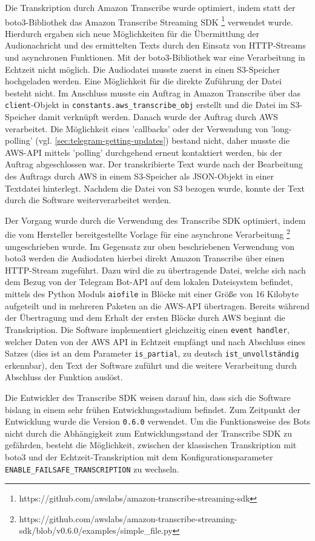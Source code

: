 Die Transkription durch Amazon Transcribe wurde optimiert, indem statt der boto3-Bibliothek das Amazon Transcribe Streaming SDK \footnote{https://github.com/awslabs/amazon-transcribe-streaming-sdk} verwendet wurde. Hierdurch ergaben sich neue Möglichkeiten für die Übermittlung der Audionachricht und des ermittelten Texts durch den Einsatz von HTTP-Streams und asynchronen Funktionen. Mit der boto3-Bibliothek war eine Verarbeitung in Echtzeit nicht möglich. Die Audiodatei musste zuerst in einen S3-Speicher hochgeladen werden. Eine Möglichkeit für die direkte Zuführung der Datei besteht nicht. Im Anschluss musste ein Auftrag in Amazon Transcribe über das \lstinline{client}-Objekt in \lstinline{constants.aws_transcribe_obj} erstellt und die Datei im S3-Speicher damit verknüpft werden. Danach wurde der Auftrag durch AWS verarbeitet. Die Möglichkeit eines 'callbacks' oder der Verwendung von 'long-polling' (vgl. \autoref{sec:telegram-getting-updates}) bestand nicht, daher musste die AWS-API mittels 'polling' durchgehend erneut kontaktiert werden, bis der Auftrag abgeschlossen war. Der transkribierte Text wurde nach der Bearbeitung des Auftrags durch AWS in einem S3-Speicher als JSON-Objekt in einer Textdatei hinterlegt. Nachdem die Datei von S3 bezogen wurde, konnte der Text durch die Software weiterverarbeitet werden.

Der Vorgang wurde durch die Verwendung des Transcribe SDK optimiert, indem die vom Hersteller bereitgestellte Vorlage für eine asynchrone Verarbeitung \footnote{https://github.com/awslabs/amazon-transcribe-streaming-sdk/blob/v0.6.0/examples/simple\_file.py} umgeschrieben wurde. Im Gegensatz zur oben beschriebenen Verwendung von boto3 werden die Audiodaten hierbei direkt Amazon Transcribe über einen HTTP-Stream zugeführt. Dazu wird die zu übertragende Datei, welche sich nach dem Bezug von der Telegram Bot-API auf dem lokalen Dateisystem befindet, mittels des Python Moduls \lstinline{aiofile} in Blöcke mit einer Größe von 16 Kilobyte aufgeteilt und in mehreren Paketen an die AWS-API übertragen. Bereits während der Übertragung und dem Erhalt der ersten Blöcke durch AWS beginnt die Transkription. Die Software implementiert gleichzeitig einen \lstinline{event handler}, welcher Daten von der AWS API in Echtzeit empfängt und nach Abschluss eines Satzes (dies ist an dem Parameter \lstinline{is_partial}, zu deutsch \lstinline{ist_unvollständig} erkennbar), den Text der Software zuführt und die weitere Verarbeitung durch Abschluss der Funktion auslöst.

Die Entwickler des Transcribe SDK weisen darauf hin, dass sich die Software bislang in einem sehr frühen Entwicklungsstadium befindet. Zum Zeitpunkt der Entwicklung wurde die Version \lstinline{0.6.0} verwendet. Um die Funktionsweise des Bots nicht durch die Abhängigkeit zum Entwicklungsstand der Transcribe SDK zu gefährden, besteht die Möglichkeit, zwischen der klassischen Transkription mit boto3 und der Echtzeit-Transkription mit dem Konfigurationsparameter \lstinline{ENABLE_FAILSAFE_TRANSCRIPTION} zu wechseln.

